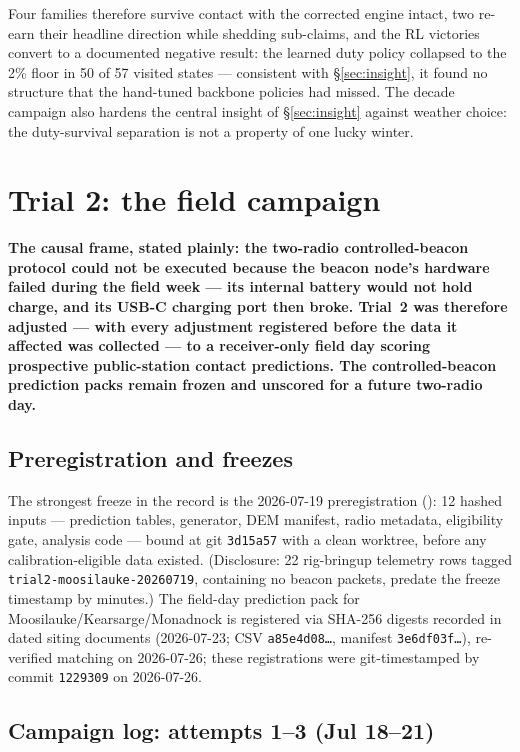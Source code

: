 \documentclass[11pt]{article}
\newcommand{\code}[1]{\texttt{\small #1}}
\begin{document}
Four families therefore survive contact with the corrected engine intact,
two re-earn their headline direction while shedding sub-claims, and the RL
victories convert to a documented negative result: the learned duty policy
collapsed to the 2\% floor in 50 of 57 visited states --- consistent with
\S\ref{sec:insight}, it found no structure that the hand-tuned backbone
policies had missed. The decade campaign also hardens the central insight
of \S\ref{sec:insight} against weather choice: the duty-survival separation
is not a property of one lucky winter.

\section{Trial 2: the field campaign}\label{sec:trial2}

\textbf{The causal frame, stated plainly: the two-radio controlled-beacon
protocol could not be executed because the beacon node's hardware failed
during the field week --- its internal battery would not hold charge, and its
USB-C charging port then broke. Trial~2 was therefore adjusted --- with every
adjustment registered before the data it affected was collected --- to a
receiver-only field day scoring prospective public-station contact
predictions. The controlled-beacon prediction packs remain frozen and
unscored for a future two-radio day.}

\subsection{Preregistration and freezes}

The strongest freeze in the record is the 2026-07-19 preregistration
(): 12 hashed inputs ---
prediction tables, generator, DEM manifest, radio metadata, eligibility gate,
analysis code --- bound at git \code{3d15a57} with a clean worktree, before
any calibration-eligible data existed. (Disclosure: 22 rig-bringup telemetry
rows tagged \code{trial2-moosilauke-20260719}, containing no beacon packets,
predate the freeze timestamp by minutes.) The field-day prediction pack for
Moosilauke/Kearsarge/Monadnock is registered via SHA-256 digests recorded in
dated siting documents (2026-07-23; CSV \code{a85e4d08\ldots}, manifest
\code{3e6df03f\ldots}), re-verified matching on 2026-07-26; these registrations were git-timestamped by commit \code{1229309} on 2026-07-26.

\subsection{Campaign log: attempts 1--3 (Jul 18--21)}
\end{document}
